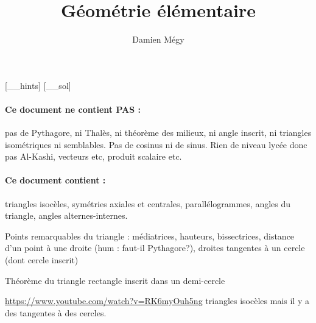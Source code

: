 




[_\jobname_hints]
[_\jobname_sol]


\title{Géométrie élémentaire}
\author{Damien Mégy}
\maketitle

\avertissement 


\paragraph{Ce document ne contient PAS :}

pas de Pythagore, ni Thalès, ni théorème des milieux, ni angle inscrit, ni triangles isométriques ni semblables. Pas de cosinus ni de sinus. Rien de niveau lycée donc pas Al-Kashi, vecteurs etc, produit scalaire etc.

\paragraph{Ce document contient :} triangles isocèles, symétries axiales et centrales, parallélogrammes, angles du triangle, angles alternes-internes.

Points remarquables du triangle : médiatrices, hauteurs, bissectrices, distance d'un point à une droite (hum : faut-il Pythagore?), droites tangentes à un cercle (dont cercle inscrit)

Théorème du triangle rectangle inscrit dans un demi-cercle

\begin{exo}
\url{https://www.youtube.com/watch?v=RK6myOuh5ng} triangles isocèles mais il y a des tangentes à des cercles.
\begin{center}
\begin{tikzpicture}
\end{tikzpicture}
\end{center}
\begin{hint}
\end{hint}
\begin{sol}
\end{sol}
\end{exo}


\indications
\correction



